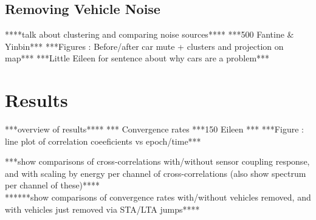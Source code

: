 \documentclass[11pt]{amsart}
\begin{document}


\subsection*{Removing Vehicle Noise}
****talk about clustering and comparing noise sources****
***500 Fantine & Yinbin***
***Figures : Before/after car mute + clusters and projection on map***
***Little Eileen for sentence about why cars are a problem***




\section*{Results}
***overview of results****
*** Convergence rates
***150 Eileen *** 
***Figure : line plot of correlation coeeficients vs epoch/time***

***show comparisons of cross-correlations with/without sensor coupling response, and with scaling by energy per channel of cross-correlations (also show spectrum per channel of these)****
\\
******show comparisons of convergence rates with/without vehicles removed, and with vehicles just removed via STA/LTA jumps****
\end{document}
